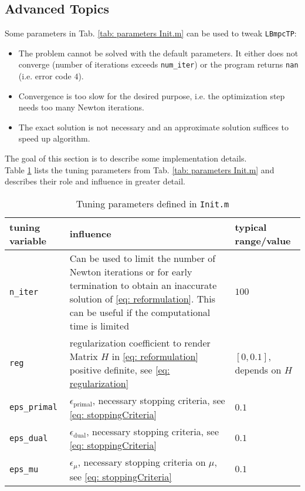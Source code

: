 \documentclass[letter]{article}
\begin{document}
\begin{sffamily}
\section{Advanced Topics}
Some parameters in Tab. \ref{tab: parameters Init.m} can be used to tweak \texttt{LBmpcTP}:
\begin{itemize}
	\item The problem cannot be solved with the default parameters. It either does not converge (number of iterations exceeds \texttt{num\_iter}) or the program returns \texttt{nan} (i.e. error code $4$).
	\item Convergence is too slow for the desired purpose, i.e. the optimization step needs too many Newton iterations.
	\item The exact solution is not necessary and an approximate solution suffices to speed up algorithm.
\end{itemize}
The goal of this section is to describe some implementation details.\\

\noindent
Table \ref{tab: tuning parameters} lists the tuning parameters from Tab. \ref{tab: parameters Init.m} and describes their role and influence in greater detail.

\begin{table}[!htdp]
\caption{Tuning parameters defined in \texttt{Init.m}}
\begin{center}
\begin{tabular}{|p{3.5cm}|p{10cm}|p{3cm}|}\hline
{
	\bf tuning variable} & influence & typical range/value \\ \hline\hline

  \texttt{n\_iter} & Can be used to limit the number of Newton iterations or for early termination to  obtain an inaccurate solution of \eqref{eq: reformulation}. This can be useful if the computational time is limited & $100$ \\ \hline
 \texttt{reg} & regularization coefficient to render Matrix $H$ in \eqref{eq: reformulation} positive definite, see \eqref{eq: regularization}  & $[0,0.1]$, depends on $H$ \\ \hline
 \texttt{eps\_primal} & $\epsilon_\text{primal}$, necessary stopping criteria, see \eqref{eq: stoppingCriteria} & $0.1$ \\ \hline
 \texttt{eps\_dual} & $\epsilon_\text{dual}$, necessary stopping criteria, see \eqref{eq: stoppingCriteria} & $0.1$ \\ \hline
 \texttt{eps\_mu} & $\epsilon_\mu$, necessary stopping criteria on $\mu$, see \eqref{eq: stoppingCriteria} & $0.1$ \\ \hline
\end{tabular}
\end{center}
\label{tab: tuning parameters}
\end{table}



\end{sffamily}
\end{document}

